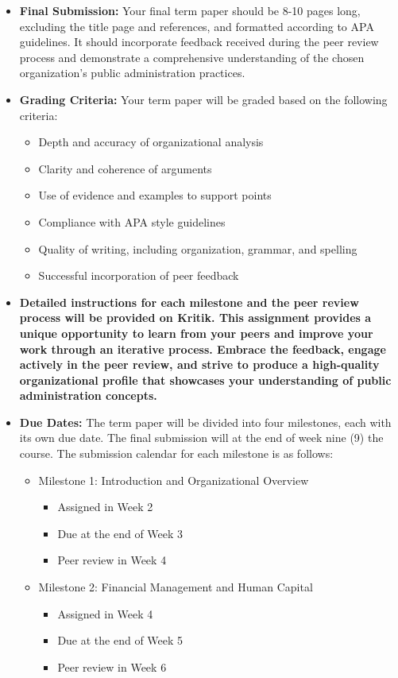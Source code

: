 \documentclass[11pt, letterpaper]{article}
\begin{document}
\begin{itemize}
\begin{itemize}
        \end{itemize}
    \item \textbf{Final Submission:} Your final term paper should be 8-10 pages long, excluding the title page and references, and formatted according to APA guidelines. It should incorporate feedback received during the peer review process and demonstrate a comprehensive understanding of the chosen organization's public administration practices.
    \item \textbf{Grading Criteria:} Your term paper will be graded based on the following criteria:
        \begin{itemize}
            \item Depth and accuracy of organizational analysis
            \item Clarity and coherence of arguments
            \item Use of evidence and examples to support points
            \item Compliance with APA style guidelines
            \item Quality of writing, including organization, grammar, and spelling
            \item Successful incorporation of peer feedback
        \end{itemize}
    \item \textbf{Detailed instructions for each milestone and the peer review process will be provided on Kritik. This assignment provides a unique opportunity to learn from your peers and improve your work through an iterative process. Embrace the feedback, engage actively in the peer review, and strive to produce a high-quality organizational profile that showcases your understanding of public administration concepts.}
    \item \textbf{Due Dates:} The term paper will be divided into four milestones, each with its own due date. The final submission will at the end of week nine (9) the course. The submission calendar for each milestone is as follows:
        \begin{itemize}
            \item Milestone 1: Introduction and Organizational Overview
                \begin{itemize}
                    \item Assigned in Week 2 
                    \item Due at the end of Week 3
                    \item Peer review in Week 4
                \end{itemize}
            \item Milestone 2: Financial Management and Human Capital 
                \begin{itemize}
                    \item Assigned in Week 4
                    \item Due at the end of Week 5
                    \item Peer review in Week 6
                \end{itemize}
            

\end{itemize}
\end{itemize}
\end{document}

